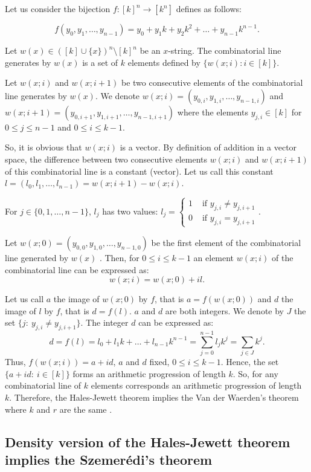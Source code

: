 Let us consider the bijection $f:[k]^n \longrightarrow [k^n]$ defines as follows:

$$f(y_0,y_1,\ldots, y_{n-1})=y_0+y_1k+y_2 k^2+\ldots+y_{n-1}k^{n-1}.$$

Let $w(x) \in ([k] \cup \{x\})^n\setminus [k]^n$ be an $x$-string. The combinatorial line generates by $w(x)$ is a set of $k$ elements defined by  $\{w(x;i):i\in [k]\}.$  

Let $w(x;i)$ and $w(x;i+1)$ be two consecutive elements of the combinatorial line generates by $w(x)$. We denote  $w(x;i)=(y_{0,i},y_{1,i},\ldots, y_{n-1,i}) $ and $w(x;i+1)=(y_{0,i+1},y_{1,i+1},\ldots, y_{n-1,i+1})$ where  the elements  $y_{j,i} \in [k]$ for $0 \leq j \leq n-1$ and $0 \leq i \leq k-1.$

So, it is obvious that $w(x;i)$ is a vector. By definition of addition in a vector space, the difference between two consecutive elements $w(x;i)$ and $w(x;i+1)$ of this combinatorial line is a constant (vector). Let us call this constant $l=(l_0, l_1, \ldots, l_{n-1})= w(x;i+1)-w(x;i)$.


For $j\in \{0,1,\ldots, n-1\}$, $l_j$ has two values: 
$l_j= \left\lbrace \begin{array}{ll}1 & \text{ if } y_{j,i}\neq y_{j,i+1} \\ 0 & \text{ if } y_{j,i} =  y_{j,i+1}   \end{array} \right. .$

Let $w(x;0)=(y_{0,0},y_{1,0},\ldots, y_{n-1,0})$ be the first element of the combinatorial line generated by $w(x)$ . Then, for $0\leq i \leq k-1$ an element $w(x;i)$ of the combinatorial line can be expressed as: $$w(x;i)=w(x;0)+il.$$

Let us call  $a$ the image of $w(x;0)$ by $f$, that is $a=f(w(x;0))$ and  $d$ the image of $l$ by $f$, that is $d=f(l).$ $a$ and $d$ are both integers.  We denote by $J$ the set $\{j: \ y_{j,i}\neq y_{j,i+1} \}.$ The integer $d$ can be expressed as:
$$d=f(l)=l_0+l_1k+\ldots+l_{n-1}k^{n-1}=\sum_{j=0}^{n-1}l_jk^j= \sum_{j\in J} k^j.$$
Thus, $f(w(x;i))=a+id$, $a$ and $d$ fixed, $0\leq i \leq k-1$. Hence, the set $\{a+id: \ i\in [k]\}$ forms an arithmetic progression of length $k.$ So, for any combinatorial line of $k$ elements corresponds an arithmetic progression of length $k.$ 
Therefore, the Hales-Jewett theorem implies the Van der Waerden's theorem where $k$ and $r$ are the same .

\subsection{Density version of the Hales-Jewett theorem implies the  Szemerédi's theorem}

